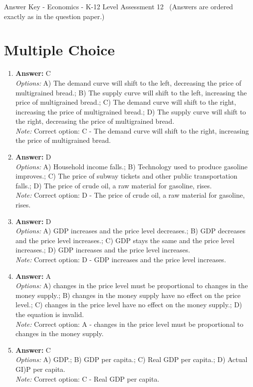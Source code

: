 \documentclass[12pt]{article}
\begin{document}
\begin{center}
Answer Key - Economics - K-12 Level Assessment 12 \
\small (Answers are ordered exactly as in the question paper.)
\end{center}

\section*{Multiple Choice}
\begin{enumerate}[label=\arabic*.]
\item \textbf{Answer:} C
\\ \textit{Options:} A) The demand curve will shift to the left, decreasing the price of multigrained bread.; B) The supply curve will shift to the left, increasing the price of multigrained bread.; C) The demand curve will shift to the right, increasing the price of multigrained bread.; D) The supply curve will shift to the right, decreasing the price of multigrained bread.
\\ \textit{Note:} Correct option: C - The demand curve will shift to the right, increasing the price of multigrained bread.
\item \textbf{Answer:} D
\\ \textit{Options:} A) Household income falls.; B) Technology used to produce gasoline improves.; C) The price of subway tickets and other public transportation falls.; D) The price of crude oil, a raw material for gasoline, rises.
\\ \textit{Note:} Correct option: D - The price of crude oil, a raw material for gasoline, rises.
\item \textbf{Answer:} D
\\ \textit{Options:} A) GDP increases and the price level decreases.; B) GDP decreases and the price level increases.; C) GDP stays the same and the price level increases.; D) GDP increases and the price level increases.
\\ \textit{Note:} Correct option: D - GDP increases and the price level increases.
\item \textbf{Answer:} A
\\ \textit{Options:} A) changes in the price level must be proportional to changes in the money supply.; B) changes in the money supply have no effect on the price level.; C) changes in the price level have no effect on the money supply.; D) the equation is invalid.
\\ \textit{Note:} Correct option: A - changes in the price level must be proportional to changes in the money supply.
\item \textbf{Answer:} C
\\ \textit{Options:} A) GDP.; B) GDP per capita.; C) Real GDP per capita.; D) Actual GI)P per capita.
\\ \textit{Note:} Correct option: C - Real GDP per capita.
\end{enumerate}
\end{document}
